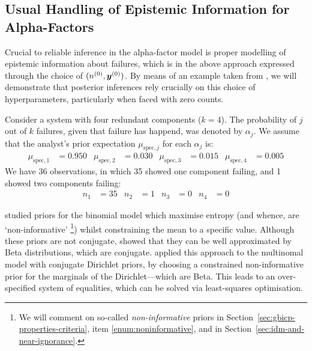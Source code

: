 \subsection{Usual Handling of Epistemic Information for Alpha-Factors}
\label{sec:epistemic-alpha}

Crucial to reliable inference in the alpha-factor model
is proper modelling of epistemic information about failures,
which is in the above approach expressed through the choice of $(n^{(0)},{\bm y}^{(0)})$.
By means of an example taken from \textcite{2011:kelly:atwood},
we will demonstrate that posterior inferences rely crucially on this choice of hyperparameters,
particularly when faced with zero counts.


Consider a system with four redundant components ($k=4$).
The probability of $j$ out of $k$ failures, given that failure has happend, was denoted by $\alpha_j$.
We assume that the analyst's prior expectation $\mu_{\text{spec},j}$ for each $\alpha_j$ is:
\begin{align}
  \label{eq:example:muspec}
  \mu_{\text{spec},1} &= 0.950
  &
  \mu_{\text{spec},2} &= 0.030
  &
  \mu_{\text{spec},3} &= 0.015
  &
  \mu_{\text{spec},4} &= 0.005
\end{align}
We have 36 observations, in which 35 showed one component failing,
and 1 showed two components failing:
\begin{align*}
  n_1 &= 35
  &
  n_2 &= 1
  &
  n_3 &= 0
  &
  n_4 &= 0
\end{align*}

\textcite{1996:atwood} studied priors for the binomial model
which maximise entropy (and whence, are `non-informative'%
\footnote{We will comment on so-called \emph{non-informative} priors in
Section~\ref{sec:gbicp-properties-criteria}, item \ref{enum:noninformative},
and in Section~\ref{sec:idm-and-near-ignorance}.})
whilst constraining the mean to a specific value.
Although these priors are not conjugate,
\textcite{1996:atwood} showed that they can be well approximated by Beta distributions, which are conjugate.
%
\textcite{2011:kelly:atwood} applied this approach to the multinomal model with conjugate Dirichlet priors,
by choosing a constrained non-informative prior for the marginals of the Dirichlet---which are Beta.
This leads to an over-specified system of equalities, which can be solved via least-squares optimisation.

